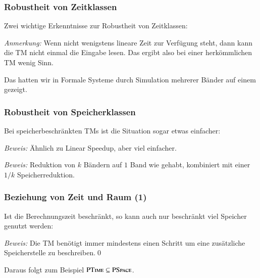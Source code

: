 \documentclass[aspectratio=1610,onlymath]{beamer}
\begin{document}
\begin{frame}\frametitle{Robustheit von Zeitklassen}

Zwei wichtige Erkenntnisse zur Robustheit von Zeitklassen:
\bigskip

\bigskip

\emph{Anmerkung:} Wenn nicht wenigstens lineare Zeit zur Verfügung steht, dann kann die TM nicht einmal die Eingabe lesen. Das ergibt also bei einer herkömmlichen TM wenig Sinn.
\bigskip\pause

\bigskip

Das hatten wir in Formale Systeme durch Simulation mehrerer Bänder auf einem gezeigt.

\end{frame}

\begin{frame}\frametitle{Robustheit von Speicherklassen}

Bei speicherbeschränkten TMs ist die Situation sogar etwas einfacher:
\bigskip

\bigskip\pause

\emph{Beweis:} Ähnlich zu Linear Speedup, aber viel einfacher.\bigskip\pause

\bigskip\pause

\emph{Beweis:} Reduktion von $k$ Bändern auf $1$ Band wie gehabt, kombiniert mit einer $1/k$ Speicherreduktion.

\end{frame}


\begin{frame}\frametitle{Beziehung von Zeit und Raum (1)}

Ist die Berechnungszeit beschränkt, so kann auch nur beschränkt viel 
Speicher genutzt werden:\bigskip


\emph{Beweis:} Die TM benötigt immer mindestens einen Schritt um eine zusätzliche Speicherstelle zu beschreiben.\qed\bigskip

\pause Daraus folgt zum Beispiel ${\textsc{PTime}}\subseteq{\textsc{PSpace}}$.

\end{frame}
\end{document}

